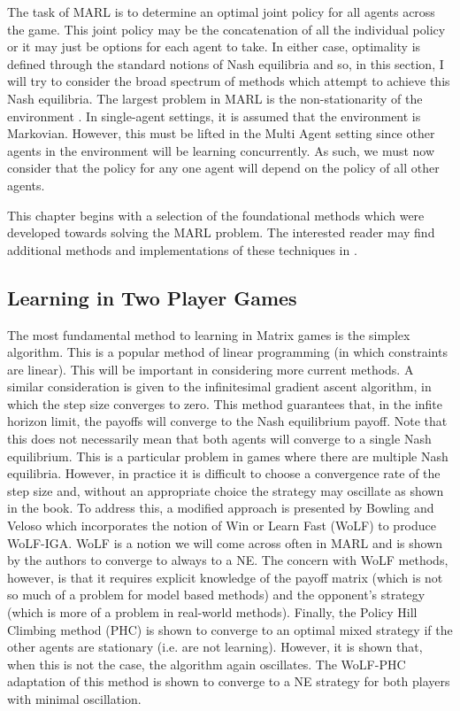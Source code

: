 \documentclass[.../main.tex]{subfiles}
\begin{document}
The task of MARL is to determine an optimal joint policy for all agents across the game. This joint
policy may be the concatenation of all the individual policy or it may just be options for each
agent to take. In either case, optimality is defined through the standard notions of Nash equilibria
and so, in this section, I will try to consider the broad spectrum of methods which attempt to
achieve this Nash equilibria. The largest problem in MARL is the non-stationarity of the environment
\cite{Hernandez-LealA}. In single-agent settings, it is assumed that the environment is Markovian.
However, this must be lifted in the Multi Agent setting since other agents in the environment will
be learning concurrently. As such, we must now consider that the policy for any one agent will
depend on the policy of all other agents. 

This chapter begins with a selection of the foundational methods which were developed towards
solving the MARL problem. The interested reader may find additional methods and implementations of
these techniques in \cite{SchwartzMulti-agentApproach}.

\subsection{Learning in Two Player Games} \label{sec::Two_Player_Games}

The most fundamental method to learning in Matrix games is the simplex algorithm. This is a popular
method of linear programming (in which constraints are linear). This will be important in
considering more current methods. A similar consideration is given to the infinitesimal gradient
ascent algorithm, in which the step size converges to zero. This method guarantees that, in the
infite horizon limit, the payoffs will converge to the Nash equilibrium payoff. Note that this does
not necessarily mean that both agents will converge to a single Nash equilibrium. This is a
particular problem in games where there are multiple Nash equilibria. However, in practice it is
difficult to choose a convergence rate of the step size and, without an appropriate choice the
strategy may oscillate as shown in the book. To address this, a modified approach is presented by
Bowling and Veloso which incorporates the notion of Win or Learn Fast (WoLF) to produce WoLF-IGA.
WoLF is a notion we will come across often in MARL and is shown by the authors to converge to always
to a NE. The concern with WoLF methods, however, is that it requires explicit knowledge of the
payoff matrix (which is not so much of a problem for model based methods) and the opponent's
strategy (which is more of a problem in real-world methods). Finally, the Policy Hill Climbing
method (PHC) is shown to converge to an optimal mixed strategy if the other agents are stationary
(i.e. are not learning). However, it is shown that, when this is not the case, the algorithm again
oscillates. The WoLF-PHC adaptation of this method is shown to converge to a NE strategy for both
players with minimal oscillation. 
\end{document}
